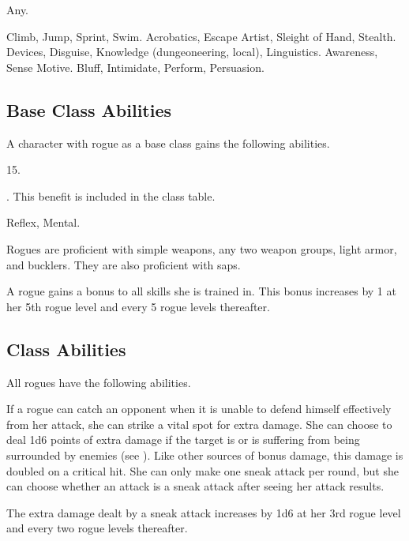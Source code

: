     Any.

     Climb, Jump, Sprint, Swim.
     Acrobatics, Escape Artist, Sleight of Hand, Stealth.
     Devices, Disguise, Knowledge (dungeoneering, local), Linguistics.
     Awareness, Sense Motive.
     Bluff, Intimidate, Perform, Persuasion.

    \subsection{Base Class Abilities}
        A character with rogue as a base class gains the following abilities.

         15.

         . This benefit is included in the class table.

          Reflex,  Mental.

        Rogues are proficient with simple weapons, any two weapon groups, light armor, and bucklers.
        They are also proficient with saps.

        A rogue gains a  bonus to all skills she is trained in.
        This bonus increases by 1 at her 5th rogue level and every 5 rogue levels thereafter.

    \subsection{Class Abilities}
        All rogues have the following abilities.

        If a rogue can catch an opponent when it is unable to defend himself effectively from her attack, she can strike a vital spot for extra damage.
        She can choose to deal 1d6 points of extra damage if the target is \unaware or is suffering  from being surrounded by enemies (see ).
        Like other sources of bonus damage, this damage is doubled on a critical hit.
        She can only make one sneak attack per round, but she can choose whether an attack is a sneak attack after seeing her attack results.

        The extra damage dealt by a sneak attack increases by 1d6 at her 3rd rogue level and every two rogue levels thereafter.

